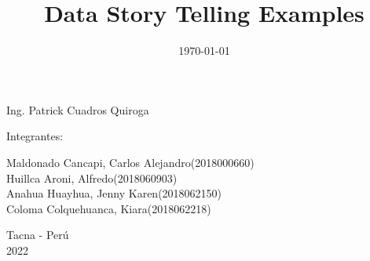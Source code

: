 \documentclass[twoside,twocolumn]{article}
\begin{document}
\begin{titlepage}
\begin{center}
\vspace*{0.1in}
\begin{large}
 Ing. Patrick Cuadros Quiroga\\
\end{large}

\vspace*{0.2in}
\vspace*{0.1in}
\begin{large}

Integrantes: \\
\begin{flushleft}
Maldonado Cancapi, Carlos Alejandro\hfill(2018000660) \\
Huillca Aroni, Alfredo\hfill(2018060903)\\
Anahua Huayhua, Jenny Karen\hfill(2018062150)\\
Coloma Colquehuanca, Kiara\hfill(2018062218)\\

\end{flushleft}
\end{large}

\vspace*{0.1in}
\begin{large}
Tacna - Perú\\
2022
\end{large}
\end{center}
\end{titlepage}

\setlength{\droptitle}{-4\baselineskip} %

\pretitle{\begin{center}\Huge\bfseries} %
\posttitle{\end{center}} %
\title{ Data Story Telling Examples } %

\date{\today} %
\renewcommand{\maketitlehookd}{%

}




\maketitle

\end{document}
